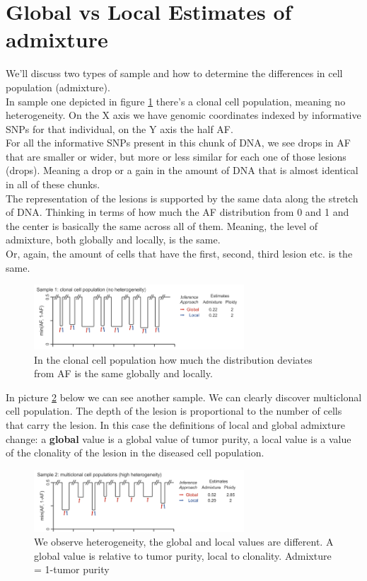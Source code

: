 \section{Global vs Local Estimates of admixture}\label{sec:admixture}
We'll discuss two types of sample and how to determine the differences in cell population (admixture).
\\
In sample one depicted in figure \ref{fig:sample1} there's a clonal cell population, meaning no heterogeneity. On the X axis we have genomic coordinates indexed by informative SNPs for that individual, on the Y axis the half AF.
\\
For all the informative SNPs present in this chunk of DNA, we see drops in AF that are smaller or wider, but more or less similar for each one of those lesions (drops). Meaning a drop or a gain in the amount of DNA that is almost identical in all of these chunks. \\
The representation of the lesions is supported by the same data along the stretch of DNA.
Thinking in terms of how much the AF distribution from 0 and 1 and the center is basically the same across all of them. Meaning, the level of admixture, both globally and locally, is the same. \\
Or, again, the amount of cells that have the first, second, third lesion etc. is the same.

\begin{figure}[H]
	\centering
	\includegraphics[width=0.7\textwidth]{sample1.png}
	\caption{In the clonal cell population how much the distribution deviates from AF is the same globally and locally.}
	\label{fig:sample1}
\end{figure}

In picture \ref{fig:sample2} below we can see another sample.
We can clearly discover multiclonal cell population. The depth of the lesion is proportional to the number of cells that carry the lesion.
In this case the definitions of local and global admixture change: a \textbf{global} value is a global value of tumor purity, a local value is a value of the clonality of the lesion in the diseased cell population.

\begin{figure}[H]
	\centering
	\includegraphics[width=0.7\textwidth]{sample2.png}
	\caption{We observe heterogeneity, the global and local values are different. A global value is relative to tumor purity, local to clonality. Admixture = 1-tumor purity}
	\label{fig:sample2}
\end{figure}

